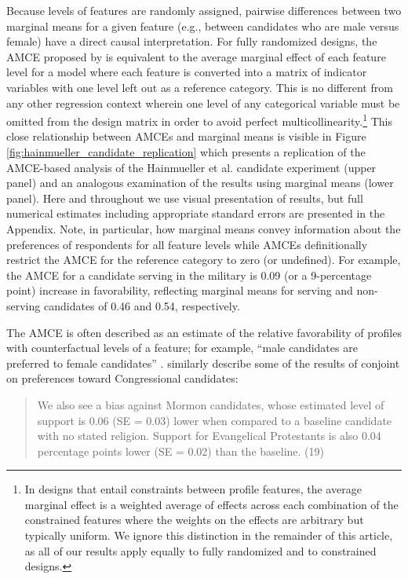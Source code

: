 \documentclass[a4paper,12pt]{article}\usepackage[]{graphicx}\usepackage[]{color}
\begin{document}
Because levels of features are randomly assigned, pairwise differences between two marginal means for a given feature (e.g., between candidates who are male versus female) have a direct causal interpretation. For fully randomized designs, the AMCE proposed by \citet{HainmuellerHopkinsYamamoto2014} is equivalent to the average marginal effect of each feature level for a model where each feature is converted into a matrix of indicator variables with one level left out as a reference category. This is no different from any other regression context wherein one level of any categorical variable must be omitted from the design matrix in order to avoid perfect multicollinearity.\footnote{In designs that entail constraints between profile features, the average marginal effect is a weighted average of effects across each combination of the constrained features where the weights on the effects are arbitrary but typically uniform. We ignore this distinction in the remainder of this article, as all of our results apply equally to fully randomized and to constrained designs.} This close relationship between AMCEs and marginal means is visible in Figure \ref{fig:hainmueller_candidate_replication} which presents a replication of the AMCE-based analysis of the Hainmueller et al. candidate experiment (upper panel) and an analogous examination of the results using marginal means (lower panel). Here and throughout we use visual presentation of results, but full numerical estimates including appropriate standard errors are presented in the Appendix. Note, in particular, how marginal means convey information about the preferences of respondents for all feature levels while AMCEs definitionally restrict the AMCE for the reference category to zero (or undefined). For example, the AMCE for a candidate serving in the military is 0.09 (or a 9-percentage point) increase in favorability, reflecting marginal means for serving and non-serving candidates of 0.46 and 0.54, respectively.

The AMCE is often described as an estimate of the relative favorability of profiles with counterfactual levels of a feature; for example, ``male candidates are preferred to female candidates'' \citep[6]{TeeleKallaRosenbluth2018}. \citet{HainmuellerHopkinsYamamoto2014} similarly describe some of the results of conjoint on preferences toward Congressional candidates:

\begin{quote}
We also see a bias against Mormon candidates, whose estimated level of support is 0.06 (SE = 0.03) lower when compared to a baseline candidate with no stated religion. Support for Evangelical Protestants is also 0.04 percentage points lower (SE = 0.02) than the baseline. (19)
\end{quote}
\end{document}
